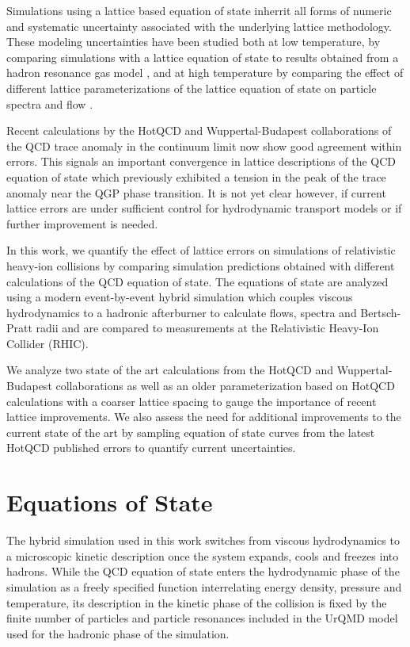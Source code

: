 \documentclass[aps,prc,reprint,amsmath,nofootinbib,superscriptaddress]{revtex4-1}
\begin{document}
Simulations using a lattice based equation of state inherrit all forms of numeric and systematic uncertainty associated with the underlying 
lattice methodology. These modeling uncertainties have been studied both at low temperature, by comparing simulations with a lattice equation of 
state to results obtained from a hadron resonance gas model \cite{Huovinen:2009yb}, and at high temperature by comparing the effect of different 
lattice parameterizations of the lattice equation of state on particle spectra and flow \cite{Huovinen:2005gy, Huovinen:2009yb}. 

Recent calculations by the HotQCD and Wuppertal-Budapest collaborations of the QCD trace anomaly in the continuum limit now show good agreement within 
errors. This signals an important convergence in lattice descriptions of the QCD equation of state which previously exhibited a tension in the peak 
of the trace anomaly near the QGP phase transition. It is not yet clear however, if current lattice errors are under sufficient control for 
hydrodynamic transport models or if further improvement is needed.  

In this work, we quantify the effect of lattice errors on simulations of relativistic heavy-ion collisions by comparing simulation predictions obtained 
with different calculations of the QCD equation of state. The equations of state are analyzed using a modern event-by-event hybrid simulation which couples
viscous hydrodynamics to a hadronic afterburner to calculate flows, spectra and Bertsch-Pratt radii and are compared to measurements at the Relativistic
Heavy-Ion Collider (RHIC).
 
We analyze two state of the art calculations from the HotQCD and Wuppertal-Budapest collaborations as well as an older parameterization based on HotQCD 
calculations with a coarser lattice spacing to gauge the importance of recent lattice improvements. We also assess the need for additional improvements 
to the current state of the art by sampling equation of state curves from the latest HotQCD published errors to quantify current uncertainties. 



\section{Equations of State}
\label{eos}

The hybrid simulation used in this work switches from viscous hydrodynamics to a microscopic kinetic description once the system expands, cools and freezes 
into hadrons. While the QCD equation of state enters the hydrodynamic phase of the simulation as a freely specified function interrelating energy density, 
pressure and temperature, its description in the kinetic phase of the collision is fixed by the finite number of particles and particle resonances included 
in the UrQMD model used for the hadronic phase of the simulation.
\end{document}
